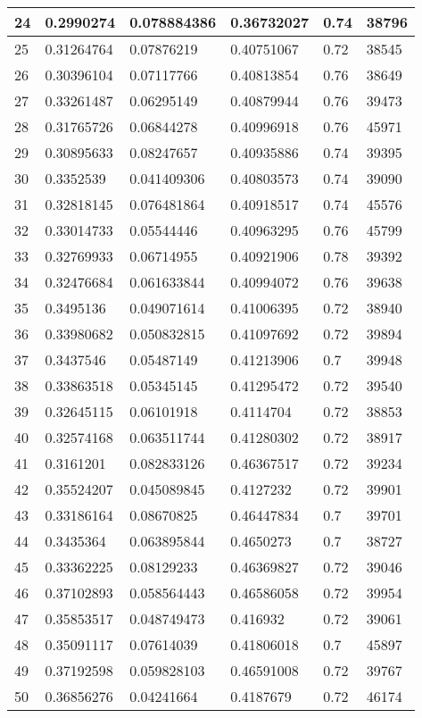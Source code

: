 \begin{longtable}{|l|l|l|l|l|l|}
24 & 0.2990274 & 0.078884386 & 0.36732027 & 0.74 & 38796 \\ \hline 
25 & 0.31264764 & 0.07876219 & 0.40751067 & 0.72 & 38545 \\ \hline 
26 & 0.30396104 & 0.07117766 & 0.40813854 & 0.76 & 38649 \\ \hline 
27 & 0.33261487 & 0.06295149 & 0.40879944 & 0.76 & 39473 \\ \hline 
28 & 0.31765726 & 0.06844278 & 0.40996918 & 0.76 & 45971 \\ \hline 
29 & 0.30895633 & 0.08247657 & 0.40935886 & 0.74 & 39395 \\ \hline 
30 & 0.3352539 & 0.041409306 & 0.40803573 & 0.74 & 39090 \\ \hline 
31 & 0.32818145 & 0.076481864 & 0.40918517 & 0.74 & 45576 \\ \hline 
32 & 0.33014733 & 0.05544446 & 0.40963295 & 0.76 & 45799 \\ \hline 
33 & 0.32769933 & 0.06714955 & 0.40921906 & 0.78 & 39392 \\ \hline 
34 & 0.32476684 & 0.061633844 & 0.40994072 & 0.76 & 39638 \\ \hline 
35 & 0.3495136 & 0.049071614 & 0.41006395 & 0.72 & 38940 \\ \hline 
36 & 0.33980682 & 0.050832815 & 0.41097692 & 0.72 & 39894 \\ \hline 
37 & 0.3437546 & 0.05487149 & 0.41213906 & 0.7 & 39948 \\ \hline 
38 & 0.33863518 & 0.05345145 & 0.41295472 & 0.72 & 39540 \\ \hline 
39 & 0.32645115 & 0.06101918 & 0.4114704 & 0.72 & 38853 \\ \hline 
40 & 0.32574168 & 0.063511744 & 0.41280302 & 0.72 & 38917 \\ \hline 
41 & 0.3161201 & 0.082833126 & 0.46367517 & 0.72 & 39234 \\ \hline 
42 & 0.35524207 & 0.045089845 & 0.4127232 & 0.72 & 39901 \\ \hline 
43 & 0.33186164 & 0.08670825 & 0.46447834 & 0.7 & 39701 \\ \hline 
44 & 0.3435364 & 0.063895844 & 0.4650273 & 0.7 & 38727 \\ \hline 
45 & 0.33362225 & 0.08129233 & 0.46369827 & 0.72 & 39046 \\ \hline 
46 & 0.37102893 & 0.058564443 & 0.46586058 & 0.72 & 39954 \\ \hline 
47 & 0.35853517 & 0.048749473 & 0.416932 & 0.72 & 39061 \\ \hline 
48 & 0.35091117 & 0.07614039 & 0.41806018 & 0.7 & 45897 \\ \hline 
49 & 0.37192598 & 0.059828103 & 0.46591008 & 0.72 & 39767 \\ \hline 
50 & 0.36856276 & 0.04241664 & 0.4187679 & 0.72 & 46174 \\ \hline 
\end{longtable}